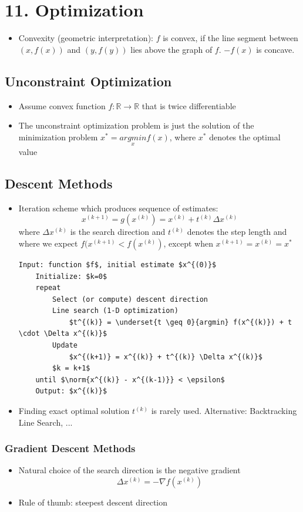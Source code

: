 \section*{11. Optimization}
\begin{itemize}
    \item
        Convexity (geometric interpretation): $f$ is convex, if the line segment between $(x, f(x))$ and $(y, f(y))$ lies above the graph of $f$. $-f(x)$ is concave.
\end{itemize}
\subsection*{Unconstraint Optimization}
\begin{itemize}
    \item
        Assume convex function $f: \mathbb{R} \rightarrow \mathbb{R}$ that is twice differentiable
    \item
        The unconstraint optimization problem is just the solution of the minimization problem $x^* = \underset{x}{argmin} f(x)$, where $x^*$ denotes the optimal value
\end{itemize}
\subsection*{Descent Methods}
\begin{itemize}
    \item
        Iteration scheme which produces sequence of estimates:
        $$x^{(k+1)} = g(x^{(k)}) = x^{(k)} + t^{(k)} \Delta x^{(k)}$$
        where $\Delta x^{(k)}$ is the search direction and $t^{(k)}$ denotes the step length and where we expect $f(x^{(k+1)} < f(x^{(k)})$, except when $x^{(k+1)} = x^{(k)} = x^*$
    \begin{lstlisting}[mathescape]
    Input: function $f$, initial estimate $x^{(0)}$
    Initialize: $k=0$
    repeat
        Select (or compute) descent direction
        Line search (1-D optimization)
            $t^{(k)} = \underset{t \geq 0}{argmin} f(x^{(k)}) + t \cdot \Delta x^{(k)}$
        Update
            $x^{(k+1)} = x^{(k)} + t^{(k)} \Delta x^{(k)}$
        $k = k+1$
    until $\norm{x^{(k)} - x^{(k-1)}} < \epsilon$
    Output: $x^{(k)}$
    \end{lstlisting}
    \item
        Finding exact optimal solution $t^{(k)}$ is rarely used. Alternative: Backtracking Line Search, ...
\end{itemize}
\subsubsection*{Gradient Descent Methods} 
\begin{itemize}
    \item
        Natural choice of the search direction is the negative gradient
        $$\Delta x^{(k)} = - \nabla f(x^{(k)})$$
    \item
        Rule of thumb: steepest descent direction
\end{itemize} 
